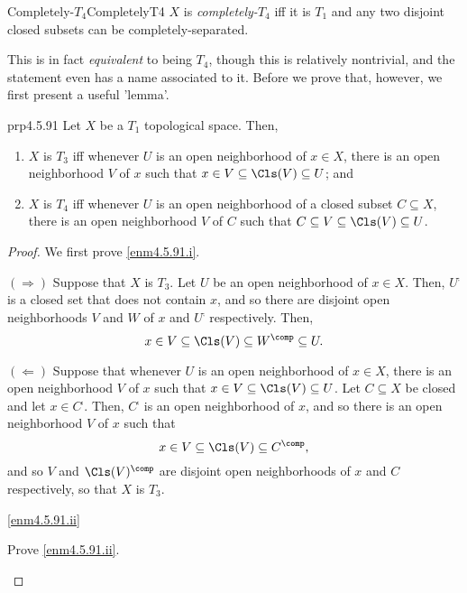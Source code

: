 \begin{dfn}{Completely-$T_4$}{CompletelyT4}
$X$ is \emph{completely-$T_4$} iff it is $T_1$ and any two disjoint closed subsets can be completely-separated.
\end{dfn}
This is in fact \emph{equivalent} to being $T_4$, though this is relatively nontrivial, and the statement even has a name associated to it.  Before we prove that, however, we first present a useful 'lemma'.
\begin{prp}{}{prp4.5.91}
Let $X$ be a $T_1$ topological space.  Then,
\begin{enumerate}
\item \label{enm4.5.91.i}$X$ is $T_3$ iff whenever $U$ is an open neighborhood of $x\in X$, there is an open neighborhood $V$ of $x$ such that $x\in V\subseteq \Cls (V)\subseteq U$; and
\item \label{enm4.5.91.ii}$X$ is $T_4$ iff whenever $U$ is an open neighborhood of a closed subset $C\subseteq X$, there is an open neighborhood $V$ of $C$ such that $C\subseteq V\subseteq \Cls (V)\subseteq U$.
\end{enumerate}
\begin{proof}
We first prove \cref{enm4.5.91.i}.

$(\Rightarrow )$ Suppose that $X$ is $T_3$.  Let $U$ be an open neighborhood of $x\in X$.  Then, $U^{\comp}$ is a closed set that does not contain $x$, and so there are disjoint open neighborhoods $V$ and $W$ of $x$ and $U^{\comp}$ respectively.  Then,
\begin{equation}
x\in V\subseteq \Cls (V)\subseteq W^{\comp}\subseteq U.
\end{equation}

\blankline
\noindent
$(\Leftarrow )$ Suppose that whenever $U$ is an open neighborhood of $x\in X$, there is an open neighborhood $V$ of $x$ such that $x\in V\subseteq \Cls (V)\subseteq U$.  Let $C\subseteq X$ be closed and let $x\in C^{\comp}$.  Then, $C^{\comp}$ is an open neighborhood of $x$, and so there is an open neighborhood $V$ of $x$ such that
\begin{equation}
x\in V\subseteq \Cls (V)\subseteq C^{\comp},
\end{equation}
and so $V$ and $\Cls (V)^{\comp}$ are disjoint open neighborhoods of $x$ and $C$ respectively, so that $X$ is $T_3$.

\blankline
\noindent
\cref{enm4.5.91.ii}
\begin{exr}[breakable=false]{}{}
Prove \cref{enm4.5.91.ii}.
\end{exr}
\end{proof}
\end{prp}
